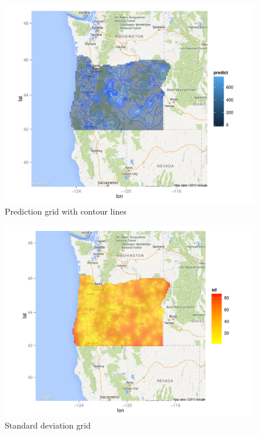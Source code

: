 \documentclass[12pt,twoside]{reedthesis}
\begin{document}
\begin{figure}[h!]
	   
	       \centering
	  
	    \includegraphics[scale=0.7]{contour_plot}
	
	     \caption{Prediction grid with contour lines}
	 \label{contour}
	\end{figure}
	
	   
	  
	
	
\begin{figure}[h!]
	   
	       \centering
	  
	    \includegraphics[scale=0.7]{sd_plot}
	
	     \caption{Standard deviation grid}
	 \label{sd}
	\end{figure}
	
\end{document}

